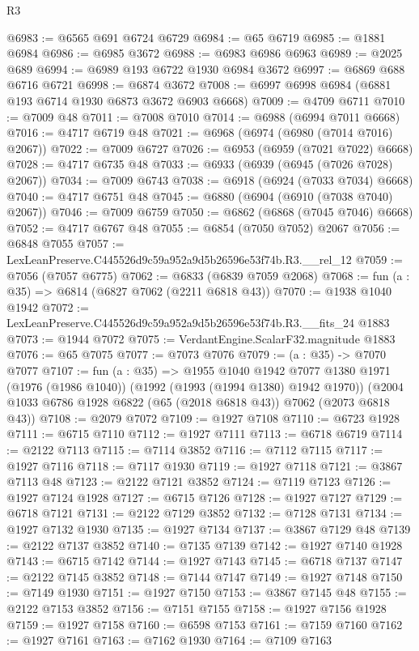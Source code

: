 \begin{lexlean}{R3}
\begin{coremodule}
@6983 := @6565 @691 @6724 @6729
@6984 := @65 @6719
@6985 := @1881 @6984
@6986 := @6985 @3672
@6988 := @6983 @6986 @6963
@6989 := @2025 @689
@6994 := @6989 @193 @6722 @1930 @6984 @3672
@6997 := @6869 @688 @6716 @6721
@6998 := @6874 @3672
@7008 := @6997 @6998 @6984 (@6881 @193 @6714 @1930 @6873 @3672 @6903 @6668)
@7009 := @4709 @6711
@7010 := @7009 @48
@7011 := @7008 @7010
@7014 := @6988 (@6994 @7011 @6668)
@7016 := @4717 @6719 @48
@7021 := @6968 (@6974 (@6980 (@7014 @7016) @2067))
@7022 := @7009 @6727
@7026 := @6953 (@6959 (@7021 @7022) @6668)
@7028 := @4717 @6735 @48
@7033 := @6933 (@6939 (@6945 (@7026 @7028) @2067))
@7034 := @7009 @6743
@7038 := @6918 (@6924 (@7033 @7034) @6668)
@7040 := @4717 @6751 @48
@7045 := @6880 (@6904 (@6910 (@7038 @7040) @2067))
@7046 := @7009 @6759
@7050 := @6862 (@6868 (@7045 @7046) @6668)
@7052 := @4717 @6767 @48
@7055 := @6854 (@7050 @7052) @2067
@7056 := @6848 @7055
@7057 := LexLeanPreserve.C445526d9c59a952a9d5b26596e53f74b.R3.__rel_12
@7059 := @7056 (@7057 @6775)
@7062 := @6833 (@6839 @7059 @2068)
@7068 := fun (a : @35) => @6814 (@6827 @7062 (@2211 @6818 @43))
@7070 := @1938 @1040 @1942
@7072 := LexLeanPreserve.C445526d9c59a952a9d5b26596e53f74b.R3.__fits_24 @1883
@7073 := @1944 @7072
@7075 := VerdantEngine.ScalarF32.magnitude @1883
@7076 := @65 @7075
@7077 := @7073 @7076
@7079 := (a : @35) -> @7070 @7077
@7107 := fun (a : @35) =>
  @1955
    @1040
    @1942
    @7077
    @1380
    @1971
    (@1976 (@1986 @1040))
    (@1992 (@1993 (@1994 @1380) @1942 @1970))
    (@2004 @1033 @6786 @1928 @6822 (@65 (@2018 @6818 @43)) @7062 (@2073 @6818 @43))
@7108 := @2079 @7072
@7109 := @1927 @7108
@7110 := @6723 @1928
@7111 := @6715 @7110
@7112 := @1927 @7111
@7113 := @6718 @6719
@7114 := @2122 @7113
@7115 := @7114 @3852
@7116 := @7112 @7115
@7117 := @1927 @7116
@7118 := @7117 @1930
@7119 := @1927 @7118
@7121 := @3867 @7113 @48
@7123 := @2122 @7121 @3852
@7124 := @7119 @7123
@7126 := @1927 @7124 @1928
@7127 := @6715 @7126
@7128 := @1927 @7127
@7129 := @6718 @7121
@7131 := @2122 @7129 @3852
@7132 := @7128 @7131
@7134 := @1927 @7132 @1930
@7135 := @1927 @7134
@7137 := @3867 @7129 @48
@7139 := @2122 @7137 @3852
@7140 := @7135 @7139
@7142 := @1927 @7140 @1928
@7143 := @6715 @7142
@7144 := @1927 @7143
@7145 := @6718 @7137
@7147 := @2122 @7145 @3852
@7148 := @7144 @7147
@7149 := @1927 @7148
@7150 := @7149 @1930
@7151 := @1927 @7150
@7153 := @3867 @7145 @48
@7155 := @2122 @7153 @3852
@7156 := @7151 @7155
@7158 := @1927 @7156 @1928
@7159 := @1927 @7158
@7160 := @6598 @7153
@7161 := @7159 @7160
@7162 := @1927 @7161
@7163 := @7162 @1930
@7164 := @7109 @7163

\end{coremodule}
\end{lexlean}
